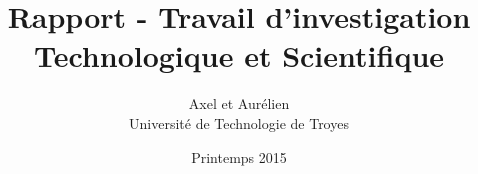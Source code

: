 \documentclass[11pt]{report}
\title{Rapport - Travail d'investigation Technologique et Scientifique}
\author{Axel \bsc{Mousset} et Aurélien \bsc{Labate} \\ Université de Technologie de Troyes}
\date{Printemps 2015}
\begin{document}
    \maketitle
    
    \tableofcontents

    
    
    
    
    
    
    

    \appendix
    

    \nocite{*}
    
    
\end{document}
